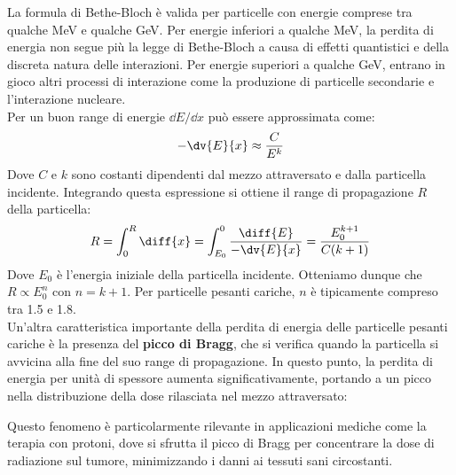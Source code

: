 La formula di Bethe-Bloch è valida per particelle con energie comprese tra qualche MeV e qualche GeV. Per energie inferiori a qualche MeV, la perdita di energia non segue più la legge di Bethe-Bloch a causa di effetti quantistici e della discreta natura delle interazioni. Per energie superiori a qualche GeV, entrano in gioco altri processi di interazione come la produzione di particelle secondarie e l'interazione nucleare.\\
Per un buon range di energie $\dd{E}/\dd{x}$ può essere approssimata come:
\begin{equation}
    -\dv{E}{x} \approx \dfrac{C}{E^{k}}
\end{equation}
Dove $C$ e $k$ sono costanti dipendenti dal mezzo attraversato e dalla particella incidente. Integrando questa espressione si ottiene il range di propagazione $R$ della particella:
\begin{equation}
    R = \int_0^{R} \diff{x} = \int_{E_0}^{0} \dfrac{\diff{E}}{-\dv{E}{x}} = \dfrac{E_0^{k+1}}{C(k+1)}
\end{equation}
Dove $E_0$ è l'energia iniziale della particella incidente. Otteniamo dunque che $R \propto E_0^{n}$ con $n = k+1$. Per particelle pesanti cariche, $n$ è tipicamente compreso tra 1.5 e 1.8.\\
Un'altra caratteristica importante della perdita di energia delle particelle pesanti cariche è la presenza del \textbf{picco di Bragg}, che si verifica quando la particella si avvicina alla fine del suo range di propagazione. In questo punto, la perdita di energia per unità di spessore aumenta significativamente, portando a un picco nella distribuzione della dose rilasciata nel mezzo attraversato:


Questo fenomeno è particolarmente rilevante in applicazioni mediche come la terapia con protoni, dove si sfrutta il picco di Bragg per concentrare la dose di radiazione sul tumore, minimizzando i danni ai tessuti sani circostanti.
